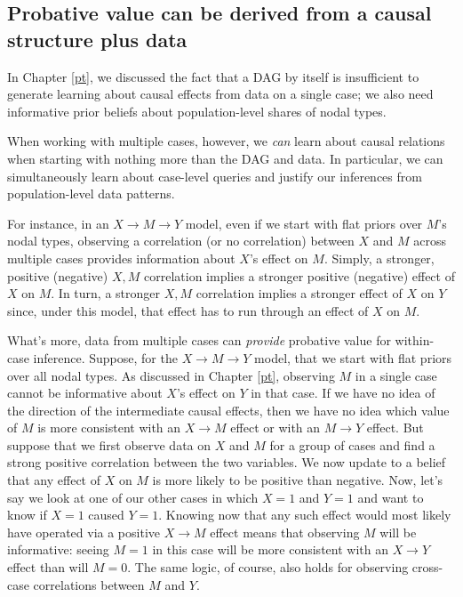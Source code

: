 \documentclass[
  12pt,
]{book}
\begin{document}
\hypertarget{probative-value-can-be-derived-from-a-causal-structure-plus-data}{%
\subsection{Probative value can be derived from a causal structure plus data}\label{probative-value-can-be-derived-from-a-causal-structure-plus-data}}

In Chapter \ref{pt}, we discussed the fact that a DAG by itself is insufficient to generate learning about causal effects from data on a single case; we also need informative prior beliefs about population-level shares of nodal types.

When working with multiple cases, however, we \emph{can} learn about causal relations when starting with nothing more than the DAG and data. In particular, we can simultaneously learn about case-level queries and justify our inferences from population-level data patterns.

For instance, in an \(X \rightarrow M \rightarrow Y\) model, even if we start with flat priors over \(M\)'s nodal types, observing a correlation (or no correlation) between \(X\) and \(M\) across multiple cases provides information about \(X\)'s effect on \(M\). Simply, a stronger, positive (negative) \(X, M\) correlation implies a stronger positive (negative) effect of \(X\) on \(M\). In turn, a stronger \(X,M\) correlation implies a stronger effect of \(X\) on \(Y\) since, under this model, that effect has to run through an effect of \(X\) on \(M\).

What's more, data from multiple cases can \emph{provide} probative value for within-case inference. Suppose, for the \(X \rightarrow M \rightarrow Y\) model, that we start with flat priors over all nodal types. As discussed in Chapter \ref{pt}, observing \(M\) in a single case cannot be informative about \(X\)'s effect on \(Y\) in that case. If we have no idea of the direction of the intermediate causal effects, then we have no idea which value of \(M\) is more consistent with an \(X \rightarrow M\) effect or with an \(M \rightarrow Y\) effect. But suppose that we first observe data on \(X\) and \(M\) for a group of cases and find a strong positive correlation between the two variables. We now update to a belief that any effect of \(X\) on \(M\) is more likely to be positive than negative. Now, let's say we look at one of our other cases in which \(X=1\) and \(Y=1\) and want to know if \(X=1\) caused \(Y=1\). Knowing now that any such effect would most likely have operated via a positive \(X \rightarrow M\) effect means that observing \(M\) will be informative: seeing \(M=1\) in this case will be more consistent with an \(X \rightarrow Y\) effect than will \(M=0\). The same logic, of course, also holds for observing cross-case correlations between \(M\) and \(Y\).
\end{document}
